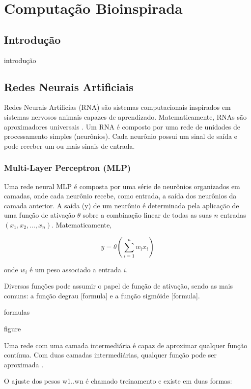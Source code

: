 \chapter{Computação Bioinspirada}
\label{bioinspirada}

\section{Introdução}

introdução

\section{Redes Neurais Artificiais}

Redes Neurais Artificias (RNA) são sistemas computacionais inspirados em sistemas
nervosos animais capazes de aprendizado. Matematicamente, RNAs são aproximadores
universais \cite{hornik89universal}. Um RNA é composto por uma rede de unidades
de processamento simples (neurônios). Cada neurônio possui um sinal de saída e
pode receber um ou mais sinais de entrada.

\subsection{Multi-Layer Perceptron (MLP)}

Uma rede neural MLP é composta por uma série de neurônios organizados em camadas, onde cada neurônio recebe, como entrada, a saída dos neurônios da camada anterior. A saída (y) de um neurônio é determinada pela aplicação de uma função de ativação \(\theta\) sobre a combinação linear de todas as suas \(n\) entradas \((x_1, x_2, ..., x_n)\). Matematicamente,

\[ y = \theta ( \sum_{i=1}^{n} w_i x_i ) \]

onde \(w_i\) é um peso associado a entrada \(i\).

Diversas funções pode assumir o papel de função de ativação, sendo as mais comuns:
a função degrau [formula] e a função sigmóide [formula].

formulas

figure

Uma rede com uma camada intermediária é capaz de aproximar qualquer função
contínua. Com duas camadas intermediárias, qualquer função pode ser aproximada
\cite{cybenko89mlp}.

O ajuste dos pesos w1..wn é chamado treinamento e existe em duas formas:

